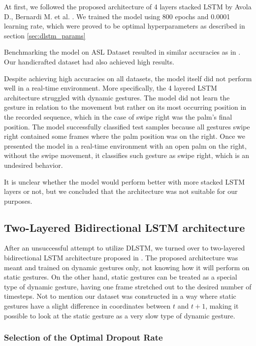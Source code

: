 At first, we followed the proposed architecture of 4 layers stacked LSTM by Avola D., Bernardi M. et al. \cite{avola}. We trained the model using 800 epochs and 0.0001 learning rate, which were proved to be optimal hyperparameters as described in section \ref{sec:dlstm_params}

Benchmarking the model on ASL Dataset resulted in similar accuracies as in \cite{avola}. Our handicrafted dataset had also achieved high results.

Despite achieving high accuracies on all datasets, the model itself did not perform well in a real-time environment. More specifically, the 4 layered LSTM architecture struggled with dynamic gestures. The model did not learn the gesture in relation to the movement but rather on its most occurring position in the recorded sequence, which in the case of swipe right was the palm's final position. The model successfully classified test samples because all gestures swipe right contained some frames where the palm position was on the right. Once we presented the model in a real-time environment with an open palm on the right, without the swipe movement, it classifies such gesture as swipe right, which is an undesired behavior. 

It is unclear whether the model would perform better with more stacked LSTM layers or not, but we concluded that the architecture was not suitable for our purposes. 

\subsection{Two-Layered Bidirectional LSTM architecture}

After an unsuccessful attempt to utilize DLSTM, we turned over to two-layered bidirectional LSTM architecture proposed in \cite{bidirect_dynam}. The proposed architecture was meant and trained on dynamic gestures only, not knowing how it will perform on static gestures. On the other hand, static gestures can be treated as a special type of dynamic gesture, having one frame stretched out to the desired number of timesteps. Not to mention our dataset was constructed in a way where static gestures have a slight difference in coordinates between $t$ and $t+1$, making it possible to look at the static gesture as a very slow type of dynamic gesture.

\subsubsection{Selection of the Optimal Dropout Rate}

